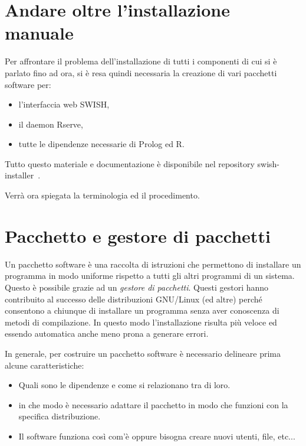 \documentclass[10pt,titlepage,twoside,a4paper]{report}
\begin{document}

\section{Andare oltre l'installazione manuale}

Per affrontare il problema dell'installazione di tutti i componenti di cui si 
è parlato fino ad ora, si è resa quindi necessaria la creazione di vari 
pacchetti software per:
\begin{itemize}
    \item l'interfaccia web SWISH,
    \item il daemon Rserve,
    \item tutte le dipendenze necessarie di Prolog ed R.
\end{itemize}

Tutto questo materiale e documentazione è disponibile nel repository 
swish-installer~\cite{swishInstaller}.
 
Verrà ora spiegata la terminologia ed il procedimento.


\section{Pacchetto e gestore di pacchetti} \label{pacchetto-e-gestore-di-pacchetti}
Un pacchetto software è una raccolta di istruzioni che permettono di 
installare un programma in modo uniforme rispetto a tutti gli altri programmi 
di un sistema. Questo è possibile grazie ad un \emph{gestore di 
pacchetti}. Questi gestori hanno contribuito al successo delle distribuzioni 
GNU/Linux (ed altre) perché consentono a chiunque di installare un 
programma senza aver conoscenza di metodi di compilazione. In questo modo  
l'installazione risulta più veloce ed essendo automatica anche meno prona a 
generare errori.

In generale, per costruire un pacchetto software è necessario delineare prima 
alcune caratteristiche:
\begin{itemize}
    \item Quali sono le dipendenze e come si relazionano tra di loro.
    \item in che modo è necessario adattare il pacchetto in modo che funzioni 
          con la specifica distribuzione.
    \item Il software funziona così com'è oppure bisogna creare nuovi utenti, 
file, etc...
\end{itemize}
\end{document}
